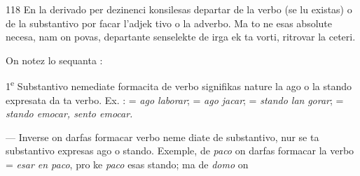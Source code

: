 \begin{VUpage}[122]{118}
En la derivado per dezinenci konsilesas departar de la\nl
verbo (se lu existas) o de la substantivo por facar l'adjek\cc
tivo o la adverbo. Ma to ne esas absolute necesa, nam on\nl
povas, departante senselekte de irga ek ta vorti, ritrovar la\nl
ceteri.

On notez lo sequanta :

1\textsuperscript{e} Substantivo nemediate formacita de verbo signifikas\nl
nature la ago o la stando expresata da ta verbo. Ex. : \nl
= \textit{ago laborar};  = \textit{ago jacar};  = \textit{stando lan}\cc
\textit{gorar};  = \textit{stando emocar, sento emocar.}

 --- Inverse on darfas formacar verbo neme\cc
diate de substantivo, nur se ta substantivo expresas ago o\nl
stando. Exemple, de \textit{paco} on darfas formacar la verbo \nl
= \textit{esar en paco}, pro ke \textit{paco} esas stando; ma de \textit{domo} on\parplein
\end{VUpage}

